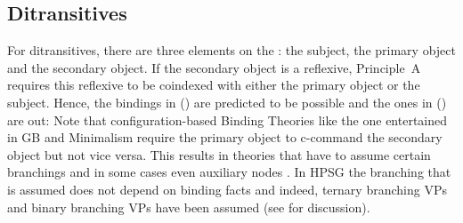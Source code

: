 \documentclass[output=paper
 	        ,biblatex
                ,babelshorthands
                ,newtxmath
                ,draftmode
                ,colorlinks, citecolor=brown
]{langscibook}
\begin{document}
\subsection{Ditransitives}

For ditransitives, there are three elements on the \argstl: the subject, the primary object and the
secondary object. If the secondary object is a reflexive, Principle~A requires this reflexive to be
coindexed with either the primary object or the subject. Hence, the bindings in () are
predicted to be possible and the ones in () are out:
\eal
{}
\zl
\eal
{}
\zl
Note that configuration-based Binding Theories like the one entertained in GB and Minimalism require
the primary object to c-command the secondary object but not vice versa. This results in theories
that have to assume certain branchings and in some cases even auxiliary nodes
\citep[Section~4.4]{Adger2003a}. In HPSG the branching that is assumed does not depend on binding
facts and indeed, ternary branching VPs \citep[]{ps2} and binary branching VPs have been assumed (see
 for discussion).
\end{document}
